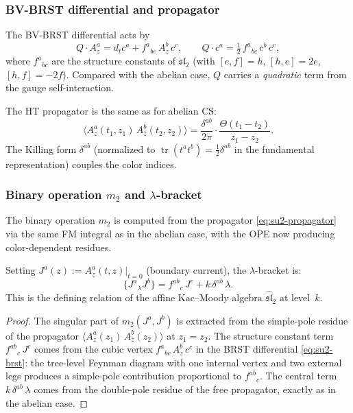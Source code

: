 \subsubsection{BV-BRST differential and propagator}

The BV-BRST differential acts by
\begin{equation}\label{eq:su2-brst}
Q \cdot A_z^a = d_t c^a + f^a{}_{bc}\, A_z^b\, c^c,
\qquad
Q \cdot c^a = \tfrac{1}{2}\, f^a{}_{bc}\, c^b\, c^c,
\end{equation}
where $f^a{}_{bc}$ are the structure constants of
$\mathfrak{sl}_2$ (with $[e,f] = h$, $[h,e] = 2e$,
$[h,f] = -2f$). Compared with the abelian case,
$Q$ carries a \emph{quadratic} term from the gauge
self-interaction.

The HT propagator is the same as for abelian CS:
\begin{equation}\label{eq:su2-propagator}
\langle A_z^a(t_1,z_1)\, A_{\bar z}^b(t_2,z_2) \rangle
= \frac{\delta^{ab}}{2\pi} \cdot
 \frac{\Theta(t_1 - t_2)}{z_1 - z_2}.
\end{equation}
The Killing form $\delta^{ab}$ (normalized to
$\operatorname{tr}(t^a t^b) = \frac{1}{2}\delta^{ab}$
in the fundamental representation) couples the color indices.

\subsubsection{Binary operation $m_2$ and $\lambda$-bracket}

The binary operation $m_2$ is computed from the propagator
\eqref{eq:su2-propagator} via the same FM integral as in the
abelian case, with the OPE now producing color-dependent
residues.

\begin{proposition}
\label{prop:su2-lambda-bracket}
Setting
$J^a(z) := A_z^a(t,z)|_{t=0}$ (boundary current), the
$\lambda$-bracket is:
\begin{equation}\label{eq:su2-lambda}
\{J^a{}_\lambda J^b\}
= f^{ab}{}_c\, J^c + k\, \delta^{ab}\, \lambda.
\end{equation}
This is the defining relation of the affine Kac--Moody algebra
$\widehat{\mathfrak{sl}}_2$ at level~$k$.
\end{proposition}

\begin{proof}
The singular part of $m_2(J^a, J^b)$ is extracted from the
simple-pole residue of the propagator
$\langle A_z^a(z_1)\, A_{\bar z}^b(z_2)\rangle$ at $z_1 = z_2$.
The structure constant term $f^{ab}{}_c\, J^c$ comes from the
cubic vertex $f^a{}_{bc}\, A_z^b\, c^c$ in the BRST differential
\eqref{eq:su2-brst}: the tree-level Feynman diagram with one
internal vertex and two external legs produces a simple-pole
contribution proportional to $f^{ab}{}_c$. The central term
$k\, \delta^{ab}\, \lambda$ comes from the double-pole residue of
the free propagator, exactly as in the abelian case.
\end{proof}

